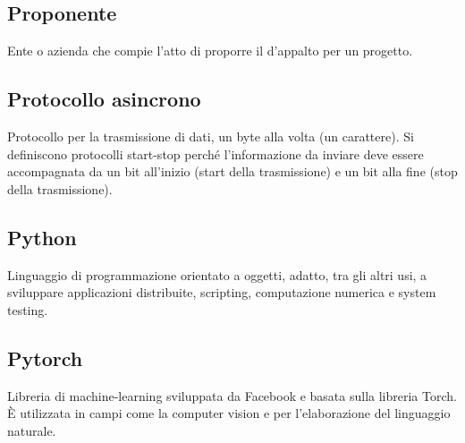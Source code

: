\subsection*{Proponente}
Ente o azienda che compie l'atto di proporre il  d'appalto per un progetto.

\subsection*{Protocollo asincrono}
Protocollo per la trasmissione di dati, un byte alla volta (un carattere). Si definiscono protocolli start-stop perché l'informazione da inviare deve essere accompagnata da un bit all'inizio (start della trasmissione) e un bit alla fine (stop della trasmissione).

\subsection*{Python}
Linguaggio di programmazione orientato a oggetti, adatto, tra gli altri usi, a sviluppare applicazioni distribuite, scripting, computazione numerica e system testing.

\subsection*{Pytorch}
Libreria  di machine-learning sviluppata da Facebook e basata sulla libreria Torch. È utilizzata in campi come la computer vision e per l'elaborazione del linguaggio naturale.

